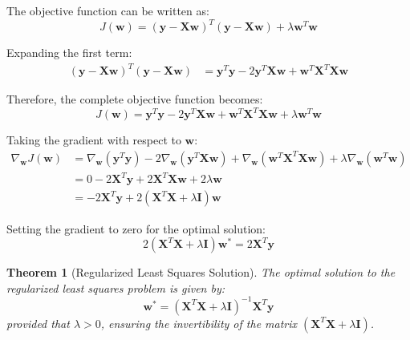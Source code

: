 \documentclass[12pt]{article}
\renewcommand{\vec}[1]{\mathbf{#1}}
\newtheorem{theorem}{Theorem}[section]
\begin{document}
The objective function can be written as:
\begin{equation}
    J(\vec{w}) = (\vec{y} - \vec{X}\vec{w})^T(\vec{y} - \vec{X}\vec{w}) + \lambda \vec{w}^T\vec{w}
\end{equation}

Expanding the first term:
\begin{align}
    (\vec{y} - \vec{X}\vec{w})^T(\vec{y} - \vec{X}\vec{w}) & = \vec{y}^T\vec{y} - 2\vec{y}^T\vec{X}\vec{w} + \vec{w}^T\vec{X}^T\vec{X}\vec{w}
\end{align}

Therefore, the complete objective function becomes:
\begin{equation}
    J(\vec{w}) = \vec{y}^T\vec{y} - 2\vec{y}^T\vec{X}\vec{w} + \vec{w}^T\vec{X}^T\vec{X}\vec{w} + \lambda \vec{w}^T\vec{w}
\end{equation}

Taking the gradient with respect to $\vec{w}$:
\begin{align}
    \nabla_{\vec{w}} J(\vec{w}) & = \nabla_{\vec{w}} (\vec{y}^T\vec{y}) - 2\nabla_{\vec{w}} (\vec{y}^T\vec{X}\vec{w}) + \nabla_{\vec{w}} (\vec{w}^T\vec{X}^T\vec{X}\vec{w}) + \lambda \nabla_{\vec{w}} (\vec{w}^T\vec{w}) \\
                                & = 0 - 2\vec{X}^T\vec{y} + 2\vec{X}^T\vec{X}\vec{w} + 2\lambda \vec{w}                                                                                                                   \\
                                & = -2\vec{X}^T\vec{y} + 2(\vec{X}^T\vec{X} + \lambda \vec{I})\vec{w}
\end{align}

Setting the gradient to zero for the optimal solution:
\begin{equation}
    2(\vec{X}^T\vec{X} + \lambda \vec{I})\vec{w}^* = 2\vec{X}^T\vec{y}
\end{equation}

\begin{theorem}[Regularized Least Squares Solution]
    The optimal solution to the regularized least squares problem is given by:
    \begin{equation} \label{eq:regularized_solution}
        \boxed{\vec{w}^* = (\vec{X}^T\vec{X} + \lambda \vec{I})^{-1}\vec{X}^T\vec{y}}
    \end{equation}
    provided that $\lambda > 0$, ensuring the invertibility of the matrix $(\vec{X}^T\vec{X} + \lambda \vec{I})$.
\end{theorem}
\end{document}
